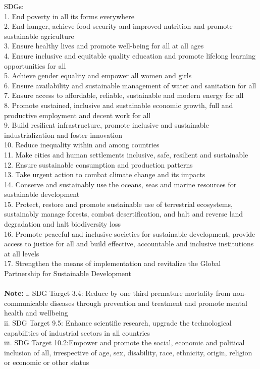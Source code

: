 \begin{appendices}
SDGs: \\
1. End poverty in all its forms everywhere  \\
2. End hunger, achieve food security and improved nutrition and promote
sustainable agriculture \\
3. Ensure healthy lives and promote well-being for all at all ages \\
4. Ensure inclusive and equitable quality education and promote lifelong
learning opportunities for all \\
5. Achieve gender equality and empower all women and girls \\
6. Ensure availability and sustainable management of water and sanitation
for all \\
7. Ensure access to affordable, reliable, sustainable and modern energy for
all \\
8. Promote sustained, inclusive and sustainable economic growth, full and
productive employment and decent work for all \\
9. Build resilient infrastructure, promote inclusive and sustainable
industrialization and foster innovation \\
10. Reduce inequality within and among countries \\
11. Make cities and human settlements inclusive, safe, resilient and
sustainable \\
12. Ensure sustainable consumption and production patterns \\
13. Take urgent action to combat climate change and its impacts \\
14. Conserve and sustainably use the oceans, seas and marine resources
for sustainable development \\
15. Protect, restore and promote sustainable use of terrestrial ecosystems,
sustainably manage forests, combat desertification, and halt and reverse land
degradation and halt biodiversity loss \\
16. Promote peaceful and inclusive societies for sustainable development,
provide access to justice for all and build effective, accountable and inclusive
institutions at all levels \\
17. Strengthen the means of implementation and revitalize the Global
Partnership for Sustainable Development \\
\vspace{}
\\\textbf {Note:} 
\i. SDG Target 3.4: Reduce by one third premature mortality from non-communicable diseases through prevention and treatment and promote mental health and wellbeing \
\\ii. SDG Target 9.5: Enhance scientific research, upgrade the technological capabilities of industrial sectors in all countries \
\\iii. SDG Target 10.2:Empower and promote the social, economic and political inclusion of all, irrespective of age, sex, disability, race, ethnicity, origin, religion or economic or other status \

\end{appendices}
